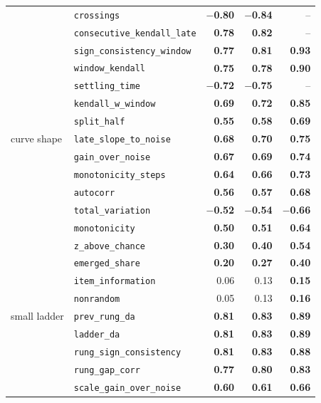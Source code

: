 \begin{table}[h]
\begin{tabular}{@{}llrrr@{}}
 & \texttt{crossings} & \textbf{$-$0.80} & \textbf{$-$0.84} & -- \\
 & \texttt{consecutive\_kendall\_late} & \textbf{0.78} & \textbf{0.82} & -- \\
 & \texttt{sign\_consistency\_window} & \textbf{0.77} & \textbf{0.81} & \textbf{0.93} \\
 & \texttt{window\_kendall} & \textbf{0.75} & \textbf{0.78} & \textbf{0.90} \\
 & \texttt{settling\_time} & \textbf{$-$0.72} & \textbf{$-$0.75} & -- \\
 & \texttt{kendall\_w\_window} & \textbf{0.69} & \textbf{0.72} & \textbf{0.85} \\
 & \texttt{split\_half} & \textbf{0.55} & \textbf{0.58} & \textbf{0.69} \\
\midrule
curve shape & \texttt{late\_slope\_to\_noise} & \textbf{0.68} & \textbf{0.70} & \textbf{0.75} \\
 & \texttt{gain\_over\_noise} & \textbf{0.67} & \textbf{0.69} & \textbf{0.74} \\
 & \texttt{monotonicity\_steps} & \textbf{0.64} & \textbf{0.66} & \textbf{0.73} \\
 & \texttt{autocorr} & \textbf{0.56} & \textbf{0.57} & \textbf{0.68} \\
 & \texttt{total\_variation} & \textbf{$-$0.52} & \textbf{$-$0.54} & \textbf{$-$0.66} \\
 & \texttt{monotonicity} & \textbf{0.50} & \textbf{0.51} & \textbf{0.64} \\
 & \texttt{z\_above\_chance} & \textbf{0.30} & \textbf{0.40} & \textbf{0.54} \\
 & \texttt{emerged\_share} & \textbf{0.20} & \textbf{0.27} & \textbf{0.40} \\
 & \texttt{item\_information} & 0.06 & 0.13 & \textbf{0.15} \\
 & \texttt{nonrandom} & 0.05 & 0.13 & \textbf{0.16} \\
\midrule
small ladder & \texttt{prev\_rung\_da} & \textbf{0.81} & \textbf{0.83} & \textbf{0.89} \\
 & \texttt{ladder\_da} & \textbf{0.81} & \textbf{0.83} & \textbf{0.89} \\
 & \texttt{rung\_sign\_consistency} & \textbf{0.81} & \textbf{0.83} & \textbf{0.88} \\
 & \texttt{rung\_gap\_corr} & \textbf{0.77} & \textbf{0.80} & \textbf{0.83} \\
 & \texttt{scale\_gain\_over\_noise} & \textbf{0.60} & \textbf{0.61} & \textbf{0.66} \\

\end{tabular}
\end{table}
